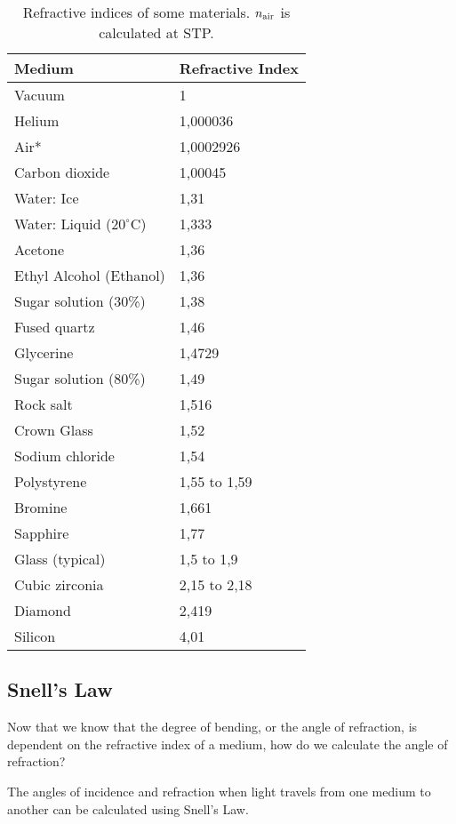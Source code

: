 \begin{table}[htbp]
\centering
\begin{tabular}{|l||l|}\hline\hline
\textbf{Medium} & \textbf{Refractive Index} \\ \hline\hline
Vacuum & 1 \\
Helium & 1,000036 \\
Air* & 1,0002926 \\
Carbon dioxide & 1,00045 \\
Water: Ice & 1,31 \\
Water: Liquid ($20^{\circ}$C) & 1,333 \\
Acetone & 1,36 \\
Ethyl Alcohol (Ethanol) & 1,36 \\
Sugar solution (30\%) & 1,38 \\
Fused quartz & 1,46\\
Glycerine & 1,4729 \\
Sugar solution (80\%) & 1,49\\
Rock salt & 1,516 \\
Crown Glass & 1,52\\
Sodium chloride & 1,54\\
Polystyrene & 1,55 to 1,59\\
Bromine & 1,661 \\
Sapphire& 1,77\\
Glass (typical) & 1,5 to 1,9 \\
Cubic zirconia & 2,15 to 2,18 \\
Diamond & 2,419 \\
Silicon & 4,01 \\ \hline
\end{tabular}
\caption{Refractive indices of some materials. $n_{\rm{air}}$ is calculated at STP.}%
\label{tab:indices}
\end{table}

\subsection{Snell's Law}
Now that we know that the degree of bending, or the angle of refraction, is dependent on the refractive index of a medium, how do we calculate the angle of refraction?

The angles of incidence and refraction when light travels from one medium to another can be calculated using Snell's Law.


